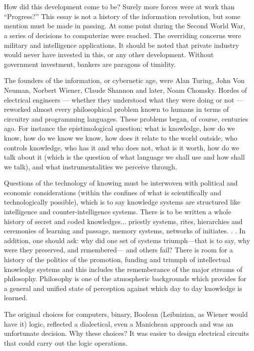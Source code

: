 \chapter{}

How did this development come to be?
Surely more forces were at work than \enquote{Progress?} 
This essay is not a history of the
information
revolution, but some
mention
must be made in passing. At some point
during the Second
World
War, a series of
decisions to computerize were reached. The
overriding concerns were military and intelligence applications. It should be noted that
private industry would never have invested
in this, or any other development. Without
government investment, bankers are paragons of timidity.

The founders of the information, or cybernetic age, were Alan Turing, John Von
Neuman, Norbert Wiener, Claude Shannon
and later, Noam Chomsky. Hordes of electrical engineers --- whether they understood
what they were doing or not --- reworked almost every philosophical problem known to
humans in terms of circuitry and programming languages. These problems began, of
course, centuries ago. For instance the epistimological question: what is knowledge,
how do we know, how do we know we
know, how does it relate to the world outside, who controls knowledge, who has it
and who does not, what is it worth, how do
we talk about it (which is the question of
what language we shall use and how shall
we talk), and what instrumentalities we perceive through.

Questions of the technology of knowing
must be interwoven with political and economic
considerations (within the confines
of what is scientifically and technologically
possible), which is to say knowledge systems are structured like intelligence and
counter-intelligence systems. There is to be
written a whole history of secret and coded
knowledges... priestly systems, rites, hierarchies and ceremonies of learning and
passage, memory systems, networks of initiates. . . In addition, one should ask: why did
one set of systems triumph—that is to say,
why were they preserved, and rrmembered—
and others fail? There is room for a history of
the politics of the promotion, funding and
triumph of intellectual knowledge systems
and this includes the rememberance of the
major streams of philosophy. Philosophy is
one of the atmospheric backgrounds which
provides for a general and unified state of
perception against which day to day knowledge is learned.

The original choices for computers, binary, Boolean (Leibnizian, as Wiener would
have it) logic, reflected a dialectical, even a
Manichean approach and was an unfortunate decision. Why these choices? It was
easier to design electrical circuits that could
carry out the logic operations.

